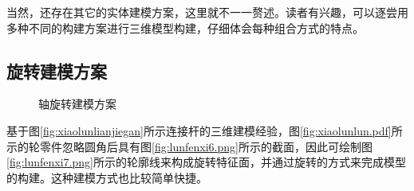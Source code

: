 当然，还存在其它的实体建模方案，这里就不一一赘述。读者有兴趣，可以逐尝用多种不同的构建方案进行三维模型构建，仔细体会每种组合方式的特点。
\subsection{旋转建模方案}

\begin{figure}[htbp]
\centering
{}\hspace{40pt}
\caption{轴旋转建模方案}
\end{figure}

基于图\ref{fig:xiaolunlianjiegan}所示连接杆的三维建模经验，图\ref{fig:xiaolunlun.pdf}所示的轮零件忽略圆角后具有图\ref{fig:lunfenxi6.png}所示的截面，因此可绘制图\ref{fig:lunfenxi7.png}所示的轮廓线来构成旋转特征面，并通过旋转的方式来完成模型的构建。这种建模方式也比较简单快捷。

\endinput